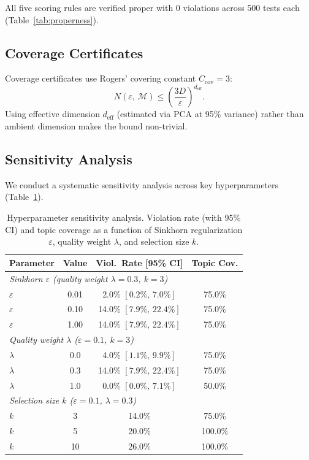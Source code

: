 \documentclass[10pt]{article}
\begin{document}
All five scoring rules are verified proper with 0 violations across 500 tests each (Table~\ref{tab:properness}).

\subsection{Coverage Certificates}

Coverage certificates use Rogers' covering constant $C_{\mathrm{cov}} = 3$:
\[
N(\varepsilon,\, \mathcal{M}) \leq \left(\frac{3D}{\varepsilon}\right)^{d_{\mathrm{eff}}}.
\]
Using effective dimension $d_{\mathrm{eff}}$ (estimated via PCA at 95\% variance) rather than ambient dimension makes the bound non-trivial.

\subsection{Sensitivity Analysis}

We conduct a systematic sensitivity analysis across key hyperparameters (Table~\ref{tab:sensitivity}).

\begin{table}[t]
\centering
\caption{Hyperparameter sensitivity analysis. Violation rate (with 95\% CI) and topic coverage as a function of Sinkhorn regularization $\varepsilon$, quality weight $\lambda$, and selection size $k$.}
\label{tab:sensitivity}
\small
\begin{tabular}{lccc}
\toprule
\textbf{Parameter} & \textbf{Value} & \textbf{Viol.\ Rate [95\% CI]} & \textbf{Topic Cov.} \\
\midrule
\multicolumn{4}{l}{\textit{Sinkhorn $\varepsilon$ (quality weight $\lambda=0.3$, $k=3$)}} \\
$\varepsilon$ & 0.01 & 2.0\% $[0.2\%,\, 7.0\%]$ & 75.0\% \\
$\varepsilon$ & 0.10 & 14.0\% $[7.9\%,\, 22.4\%]$ & 75.0\% \\
$\varepsilon$ & 1.00 & 14.0\% $[7.9\%,\, 22.4\%]$ & 75.0\% \\
\midrule
\multicolumn{4}{l}{\textit{Quality weight $\lambda$ ($\varepsilon=0.1$, $k=3$)}} \\
$\lambda$ & 0.0 & 4.0\% $[1.1\%,\, 9.9\%]$ & 75.0\% \\
$\lambda$ & 0.3 & 14.0\% $[7.9\%,\, 22.4\%]$ & 75.0\% \\
$\lambda$ & 1.0 & 0.0\% $[0.0\%,\, 7.1\%]$ & 50.0\% \\
\midrule
\multicolumn{4}{l}{\textit{Selection size $k$ ($\varepsilon=0.1$, $\lambda=0.3$)}} \\
$k$ & 3 & 14.0\% & 75.0\% \\
$k$ & 5 & 20.0\% & 100.0\% \\
$k$ & 10 & 26.0\% & 100.0\% \\
\bottomrule
\end{tabular}
\end{table}
\end{document}
